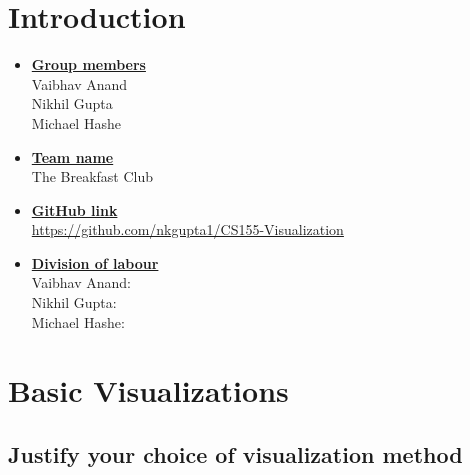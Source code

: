 \newif\ifshowsolutions
\showsolutionstrue

\newcommand{\boldline}[1]{\underline{\textbf{#1}}}


\usepackage{amsfonts} %
\usepackage{amsmath} %
\usepackage{longtable} %
\usepackage{enumitem}
\usepackage{graphicx} %
\graphicspath{{../graphics/}} %
\usepackage{makecell}
\usepackage[margin=2.25cm]{caption}


\pagestyle{fancy}

\section{Introduction}
\medskip
\begin{itemize}

    \item \boldline{Group members} \\
    Vaibhav Anand \\
    Nikhil Gupta \\
    Michael Hashe
    
    \item \boldline{Team name} \\
    The Breakfast Club

    \item \boldline{GitHub link} \\
    \href{https://github.com/nkgupta1/CS155-Visualization}{https://github.com/nkgupta1/CS155-Visualization}
    
    \item \boldline{Division of labour} \\
    Vaibhav Anand: \\
    Nikhil Gupta: \\
    Michael Hashe: 

\end{itemize}

\section{Basic Visualizations}
\medskip
\subsection{Justify your choice of visualization method}
